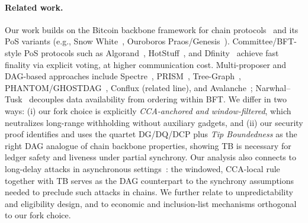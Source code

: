 \paragraph{Related work.}
Our work builds on the Bitcoin backbone framework for chain protocols~\cite{EC:GarKiaLeo15} and its PoS variants (e.g., Snow White~\cite{FC:DaiPasShi19}, Ouroboros Praos/Genesis~\cite{EC:DGKR18,CCS:BGKRZ18}). Committee/BFT-style PoS protocols such as Algorand~\cite{Algorand}, HotStuff~\cite{HotStuff}, and Dfinity~\cite{Dfinity} achieve fast finality via explicit voting, at higher communication cost. Multi-proposer and DAG-based approaches include Spectre~\cite{EPRINT:MorKulYok18}, PRISM~\cite{Prism}, Tree-Graph~\cite{EPRINT:ZhaChaLeo18}, PHANTOM/GHOSTDAG~\cite{AFT:SWZ21}, Conflux (related line), and Avalanche~\cite{SnowFamily}; Narwhal–Tusk~\cite{NarwhalTusk} decouples data availability from ordering within BFT. We differ in two ways: (i) our fork choice is explicitly \emph{CCA-anchored and window-filtered}, which neutralizes long-range withholding without auxiliary gadgets, and (ii) our security proof identifies and uses the quartet DG/DQ/DCP plus \emph{Tip Boundedness} as the right DAG analogue of chain backbone properties, showing TB is necessary for ledger safety and liveness under partial synchrony. Our analysis also connects to long-delay attacks in asynchronous settings~\cite{EC:PasSeeShe17}: the windowed, CCA-local rule together with TB serves as the DAG counterpart to the synchrony assumptions needed to preclude such attacks in chains. We further relate to unpredictability and eligibility design, and to economic and inclusion-list mechanisms orthogonal to our fork choice.
